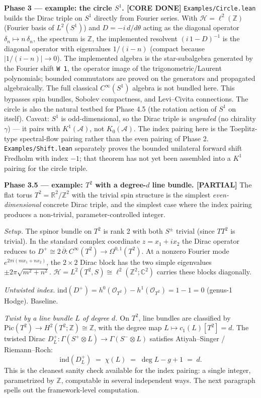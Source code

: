 \documentclass[
  11pt,
]{article}
\begin{document}
\textbf{Phase 3 --- example: the circle \(S^1\). [CORE DONE]}
\texttt{Examples/Circle.lean} builds the Dirac triple
on \(S^1\) directly from Fourier series. With
\(\mathcal{H}= \ell^2(\mathbb{Z})\) (Fourier basis of \(L^2(S^1)\)) and
\(D= -i\,d/d\theta\) acting as the diagonal operator
\(\delta_n \mapsto n\,\delta_n\), the spectrum is \(\mathbb{Z}\), the implemented
resolvent \((i\,1-D)^{-1}\) is the diagonal operator with eigenvalues
\(1/(i-n)\) (compact because \(|1/(i-n)| \to 0\)). The implemented algebra is the
star-subalgebra generated by the Fourier shift \texttt{W 1}, the operator image of the
trigonometric/Laurent polynomials; bounded commutators are proved on the generators and
propagated algebraically. The full classical \(C^\infty(S^1)\) algebra is not bundled here.
This bypasses spin bundles, Sobolev
compactness, and Levi--Civita connections. The circle is
also the natural testbed for Phase 4.5 (the rotation action of \(S^1\)
on itself). Caveat: \(S^1\) is odd-dimensional, so the Dirac triple is
\emph{ungraded} (no chirality \(\gamma\)) --- it pairs with
\(K^1(\mathcal{A})\), not \(K_0(\mathcal{A})\). The index pairing here
is the Toeplitz-type spectral-flow pairing rather than the even pairing
of Phase 2. \texttt{Examples/Shift.lean} separately proves the bounded
unilateral forward shift Fredholm with index \(-1\); that theorem has
not yet been assembled into a \(K^1\) pairing for the circle triple.

\textbf{Phase 3.5 --- example: \(T^2\) with a degree-\(d\) line bundle.
[PARTIAL]}
The flat torus \(T^2 = \mathbb{R}^2/\mathbb{Z}^2\) with the trivial spin
structure is the simplest \emph{even-dimensional} concrete Dirac triple,
and the simplest case where the index pairing produces a non-trivial,
parameter-controlled integer.

\emph{Setup.} The spinor bundle on \(T^2\) is rank 2 with both \(S^\pm\)
trivial (since \(TT^2\) is trivial). In the standard complex coordinate
\(z = x_1 + i x_2\) the Dirac operator reduces to
\(D^+ \cong 2\,\overline{\partial}\colon C^\infty(T^2) \to \Omega^{0,1}(T^2)\).
At a nonzero Fourier mode \(e^{2\pi i(m x_1 + n x_2)}\), the
\(2\times2\) Dirac block has the two simple eigenvalues
\(\pm2\pi\sqrt{m^2 + n^2}\).
\(\mathcal{H}= L^2(T^2, S) \cong \ell^2(\mathbb{Z}^2; \mathbb{C}^2)\)
carries these blocks diagonally.

\emph{Untwisted index.}
\(\mathrm{ind}(D^+) = h^0(\mathcal{O}_{T^2}) - h^1(\mathcal{O}_{T^2})
= 1 - 1 = 0\) (genus-1 Hodge). Baseline.

\emph{Twist by a line bundle \(L\) of degree \(d\).} On \(T^2\), line
bundles are classified by
\(\mathrm{Pic}(T^2) \to H^2(T^2; \mathbb{Z}) \cong \mathbb{Z}\), with
the degree map \(L \mapsto c_1(L)[T^2] = d\). The twisted Dirac
\(D_L^+ \colon \Gamma(S^+ \otimes L) \to \Gamma(S^- \otimes L)\)
satisfies Atiyah--Singer / Riemann--Roch: \[
\mathrm{ind}(D_L^+) \;=\; \chi(L) \;=\; \deg L - g + 1 \;=\; d.
\] This is the cleanest sanity check available for the index pairing: a
single integer, parametrized by \(\mathbb{Z}\), computable in several
independent ways. The next paragraph spells out the framework-level
computation.
\end{document}
